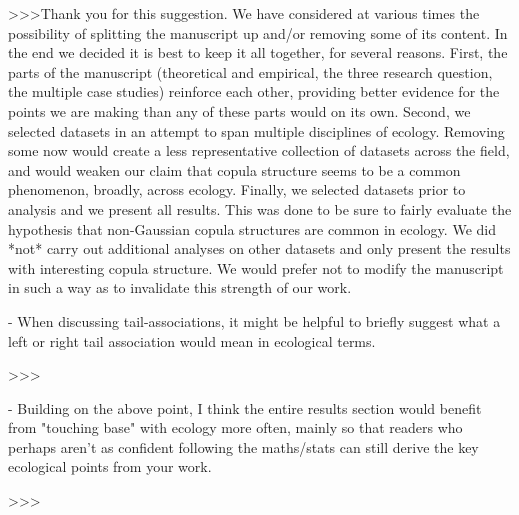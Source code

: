 >>>Thank you for this suggestion. We have considered at various times the possibility 
of splitting the manuscript up
and/or removing some of its content. In the end we decided it is best to keep it all together,
for several reasons. First, the parts of the manuscript (theoretical and empirical, the three
research question, the multiple case studies) reinforce each other, providing better evidence
for the points we are making than any of these parts would on its own. Second,
we selected datasets in an attempt to span multiple disciplines of ecology.
Removing some now would create a less representative collection of datasets across the field, and would weaken
our claim that copula structure seems to be a common phenomenon, broadly, across ecology. 
Finally, we selected datasets prior to analysis and we present all results. This was done
to be sure to fairly evaluate the hypothesis that non-Gaussian copula structures are
common in ecology. We did *not* carry out additional analyses on other datasets and
only present the results with interesting copula structure. We would prefer not to 
modify the manuscript in such a way as to invalidate this strength of our work.

- When discussing tail-associations, it might be helpful to briefly suggest what a left or right tail association would mean in ecological terms.

>>>

- Building on the above point, I think the entire results section would benefit from "touching base" with ecology more often, mainly so that readers who perhaps aren't as confident following the maths/stats can still derive the key ecological points from your work.

>>>

